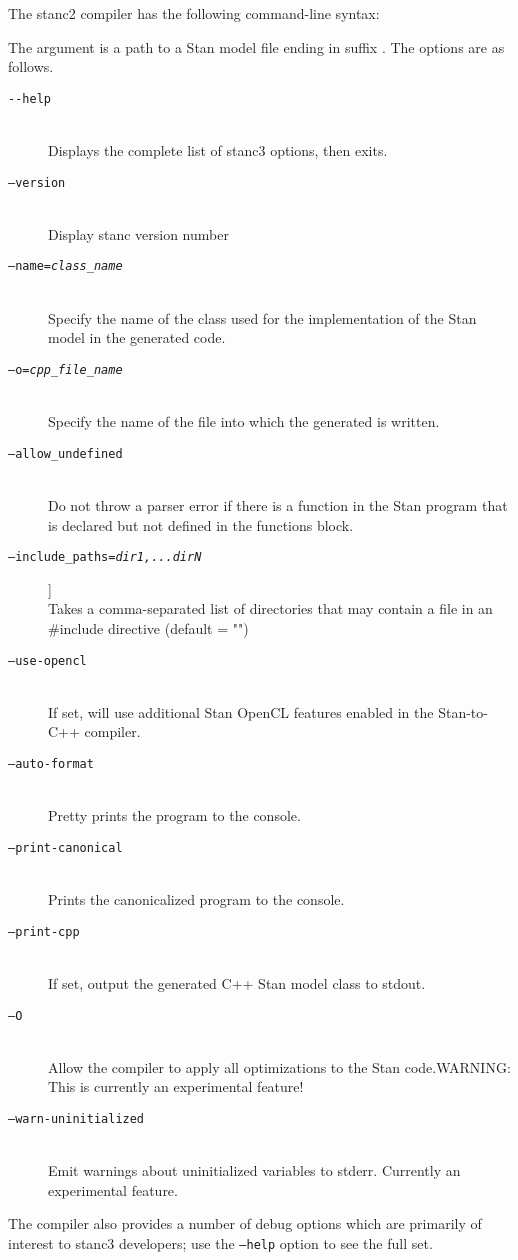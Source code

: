 The stanc2 compiler has the following command-line syntax:
%
\begin{quote}
\end{quote}
%
The argument  is a path to a Stan model
file ending in suffix .  The options are as follows.
%
\begin{description}
%
\item[\tt {-}-help] 
\mbox{ } \\ 
Displays the complete list of stanc3 options, then exits.
%
\item[\tt  --version]
\mbox{ } \\ 
 Display stanc version number
%
\item[\tt  --name={\slshape class\_name}]
\mbox{ } \\ 
Specify the name of the class used for the implementation of the
Stan model in the generated \Cpp code.  
%
\item[\tt --o={\slshape cpp\_file\_name}]
\mbox{} \\
Specify the name of the file into which the generated \Cpp is written.
%
\item[\tt  --allow\_undefined]
\mbox{ } \\ 
Do not throw a parser error if there is a function in the Stan program
that is declared but not defined in the functions block.
%
\item[\tt  --include\_paths={\slshape dir1,...dirN}]]
\mbox{ } \\ 
Takes a comma-separated list of directories that may contain a file in an \#include directive (default = "")
%
\item[\tt  --use-opencl]
\mbox{ } \\ 
If set, will use additional Stan OpenCL features enabled in the Stan-to-C++ compiler.
%
\item[\tt --auto-format]
\mbox{ } \\ 
 Pretty prints the program to the console.
%
\item[\tt  --print-canonical]
\mbox{ } \\ 
 Prints the canonicalized program to the console.
%
\item[\tt  --print-cpp]
\mbox{ } \\ 
If set, output the generated C++ Stan model class to stdout.
%
\item[\tt  --O ]
\mbox{ } \\ 
Allow the compiler to apply all optimizations to the Stan code.WARNING: This is currently an experimental feature!
%
\item[\tt  --warn-uninitialized]
\mbox{ } \\ 
Emit warnings about uninitialized variables to stderr. Currently an experimental feature.
\end{description}
%
The compiler also provides a number of debug options which are
primarily of interest to stanc3 developers; use the {\tt --help}  option
to see the full set.

